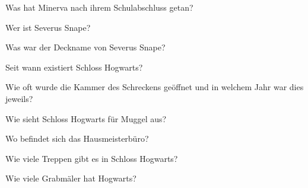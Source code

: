 \documentclass[20pt]{memoir}
\begin{document}
\begin{center}
\begin{vplace}[1]
{\HUGE Was hat Minerva nach ihrem Schulabschluss getan?
}
\end{vplace}

\newpage

\begin{vplace}[1]
{\HUGE Wer ist Severus Snape?
}
\end{vplace}

\newpage

\begin{vplace}[1]
{\HUGE Was war der Deckname von Severus Snape?
}
\end{vplace}

\newpage

\begin{vplace}[1]
{\HUGE Seit wann existiert Schloss Hogwarts?
}
\end{vplace}

\newpage

\begin{vplace}[1]
{\HUGE Wie oft wurde die Kammer des Schreckens geöffnet und in welchem Jahr war dies jeweils?
}
\end{vplace}

\newpage

\begin{vplace}[1]
{\HUGE Wie sieht Schloss Hogwarts für Muggel aus?
}
\end{vplace}

\newpage

\begin{vplace}[1]
{\HUGE Wo befindet sich das Hausmeisterbüro?
}
\end{vplace}

\newpage

\begin{vplace}[1]
{\HUGE Wie viele Treppen gibt es in Schloss Hogwarts?
}
\end{vplace}

\newpage

\begin{vplace}[1]
{\HUGE Wie viele Grabmäler hat Hogwarts?}
\end{vplace}

\newpage
\end{center}
\end{document}
